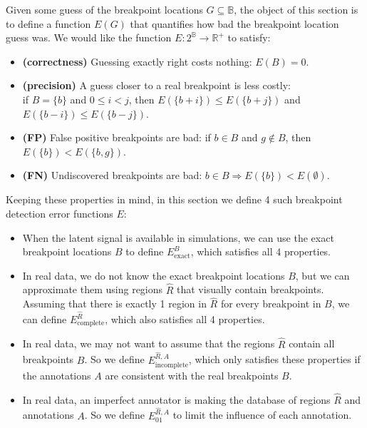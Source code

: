 \documentclass{jsfds} %
\newcommand{\RR}{\mathbb{R}}
\begin{document}
\newpage

Given some guess of the breakpoint locations $G\subseteq\mathbb B$,
the object of this section is to define a function ${E }(G)$
that quantifies how bad the breakpoint location guess was. We would
like the function ${E }: 2^{\mathbb B}\rightarrow \RR^+$ to
satisfy:

\begin{itemize}
\item \textbf{(correctness)} Guessing exactly right costs nothing: ${E }(B)=0$.
\item \textbf{(precision)} A guess closer to a real breakpoint is less
  costly:\\if $B=\{b\}$ and $0\leq i<j$, then
  ${E }(\{b+i\})\leq{E }(\{b+j\})$ and
  ${E }(\{b-i\})\leq{E }(\{b-j\})$.
\item \textbf{(FP)} False positive breakpoints are
  bad: if $b\in B$ and $g\not\in B$, then ${E }(\{b\}) <
  {E }(\{b,g\})$.
\item \textbf{(FN)} Undiscovered breakpoints are bad:
  $b\in B\Rightarrow{E }(\{b\}) < {E }(\emptyset)$.
\end{itemize}

Keeping these properties in mind, in this section we define 4 such
breakpoint detection error functions $E$:
\begin{itemize}
\item When the latent signal is available in simulations, we can use
  the exact breakpoint locations $B$ to define $E^B_{\text{exact}}$,
  which satisfies all 4 properties.
\item In real data, we do not know the exact breakpoint locations $B$,
  but we can approximate them using regions $\hat R$ that visually
  contain breakpoints. Assuming that there is exactly 1 region in
  $\hat R$ for every breakpoint in $B$, we can define
  $E^{\hat R}_{\text{complete}}$, which also satisfies all 4 properties.
\item In real data, we may not want to assume that the regions $\hat
  R$ contain all breakpoints $B$. So we define $E^{\hat
    R,A}_{\text{incomplete}}$, which only satisfies these properties
  if the annotations $A$ are consistent with the real breakpoints $B$.
\item In real data, an imperfect annotator is making the database of
  regions $\hat R$ and annotations $A$. So we define $E_{01}^{\hat
    R,A}$ to limit the influence of each annotation.
\end{itemize}
\end{document}
